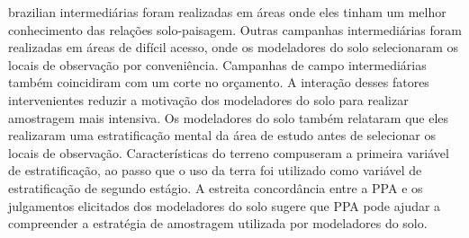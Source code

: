 \begin{chapterabstract}{brazilian}{\ptkeys}
intermediárias foram realizadas em áreas onde eles tinham um melhor conhecimento das relações solo-paisagem. 
Outras campanhas intermediárias foram realizadas em áreas de difícil acesso, onde os modeladores do solo 
selecionaram os locais de observação por conveniência. Campanhas de campo intermediárias também coincidiram 
com um corte no orçamento. A interação desses fatores intervenientes reduzir a motivação dos modeladores do 
solo para realizar amostragem mais intensiva. Os modeladores do solo também relataram que eles realizaram uma 
estratificação mental da área de estudo antes de selecionar os locais de observação. Características do 
terreno compuseram a primeira variável de estratificação, ao passo que o uso da terra foi utilizado como 
variável de estratificação de segundo estágio. A estreita concordância entre a PPA e os julgamentos elicitados 
dos modeladores do solo sugere que PPA pode ajudar a compreender a estratégia de amostragem utilizada por 
modeladores do solo.
\end{chapterabstract}

\def\enkeys{Soil spatial modelling. Free survey. Point pattern analysis. Expert judgement. Motivation}
  
